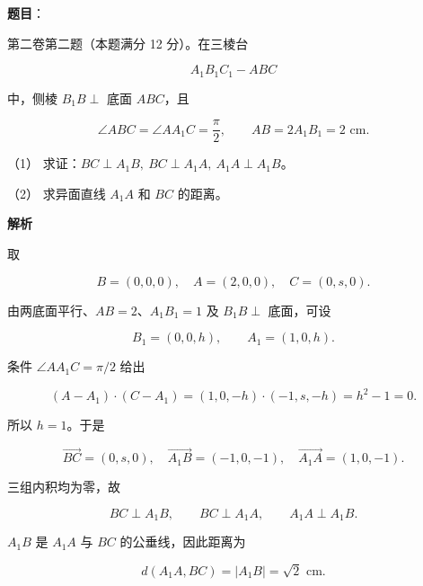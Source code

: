 \begin{answer}

\textbf{题目}：

第二卷第二题（本题满分 12 分）。在三棱台

\nopagebreak[4]
\[
A_1B_1C_1-ABC
\]

中，侧棱 $B_1B\perp$ 底面 $ABC$，且

\nopagebreak[4]
\[
\angle ABC=\angle AA_1C=\frac\pi2,\qquad
AB=2A_1B_1=2\text{ cm}.
\]
\nopagebreak[4]
\begin{center}\end{center}
\nopagebreak[4]
（1） 求证：$BC\perp A_1B,\ BC\perp A_1A,\ A_1A\perp A_1B$。

（2） 求异面直线 $A_1A$ 和 $BC$ 的距离。

\textbf{解析}


取

\nopagebreak[4]
\[
B=(0,0,0),\quad A=(2,0,0),\quad C=(0,s,0).
\]

由两底面平行、$AB=2$、$A_1B_1=1$ 及 $B_1B\perp$ 底面，可设

\nopagebreak[4]
\[
B_1=(0,0,h),\qquad A_1=(1,0,h).
\]

条件 $\angle AA_1C=\pi/2$ 给出

\nopagebreak[4]
\[
(A-A_1)\cdot(C-A_1)
=(1,0,-h)\cdot(-1,s,-h)=h^2-1=0.
\]

所以 $h=1$。于是

\nopagebreak[4]
\[
\overrightarrow{BC}=(0,s,0),\quad
\overrightarrow{A_1B}=(-1,0,-1),\quad
\overrightarrow{A_1A}=(1,0,-1).
\]

三组内积均为零，故

\nopagebreak[4]
\[
BC\perp A_1B,\qquad
BC\perp A_1A,\qquad
A_1A\perp A_1B.
\]


$A_1B$ 是 $A_1A$ 与 $BC$ 的公垂线，因此距离为

\nopagebreak[4]
\[
d(A_1A,BC)=|A_1B|=\sqrt2\text{ cm}.
\]



\end{answer}
